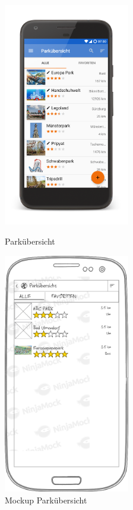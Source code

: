 \begin{figure}[h]
    \centering
    \begin{minipage}{0.49\textwidth}
        \centering
        \includegraphics[width=0.49\textwidth, trim=150 200 200 200, 
        clip]{img/screenshots/ss_parkuebersicht.png}
        \caption{Parkübersicht}
		\label{figure:implementierungparkuebersicht}
    \end{minipage}
    \begin{minipage}{0.49\textwidth}
        \centering
        \includegraphics[width=0.49\textwidth]{img/mockups/m_parkuebersicht.png}
        \caption{Mockup Parkübersicht}
    \end{minipage}
\end{figure}


